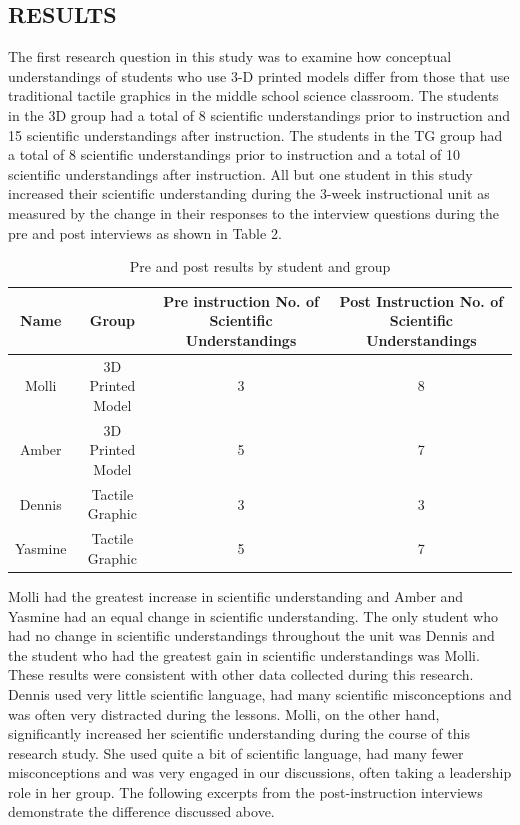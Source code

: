 \documentclass[11.5pt]{sig-alternate} %
\begin{document}
\begin{large}
\section*{RESULTS}

The first research question in this study was to examine how conceptual understandings of students who use 3-D printed models differ from those that use traditional tactile graphics in the middle school science classroom.  The students in the 3D group had a total of 8 scientific understandings prior to instruction and 15 scientific understandings after instruction.  The students in the TG group had a total of 8 scientific understandings prior to instruction and a total of 10 scientific understandings after instruction.  All but one student in this study increased their scientific understanding during the 3-week instructional unit as measured by the change in their responses to the interview questions during the pre and post interviews as shown in Table 2.  

\begin{table}[ht]
\caption{Pre and post results by student and group}
\begin{tabular}{cccc}
\hline
Name & Group & Pre instruction No. of Scientific Understandings & Post Instruction No. of Scientific Understandings \\ \hline
Molli & 3D Printed Model & 3 & 8 \\
Amber & 3D Printed Model & 5 & 7 \\
Dennis & Tactile Graphic & 3 & 3 \\
Yasmine & Tactile Graphic & 5 & 7 \\ \hline
\end{tabular}
\end{table}

Molli had the greatest increase in scientific understanding and Amber and Yasmine had an equal change in scientific understanding.  The only student who had no change in scientific understandings throughout the unit was Dennis and the student who had the greatest gain in scientific understandings was Molli.  These results were consistent with other data collected during this research.  Dennis used very little scientific language, had many scientific misconceptions and was often very distracted during the lessons.  Molli, on the other hand, significantly increased her scientific understanding during the course of this research study.  She used quite a bit of scientific language, had many fewer misconceptions and was very engaged in our discussions, often taking a leadership role in her group.  The following excerpts from the post-instruction interviews demonstrate the difference discussed above.


\end{large}
\end{document}
